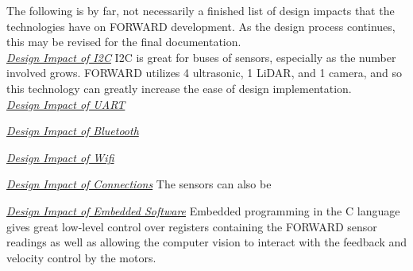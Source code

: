 \newline \noindent The following is by far, not necessarily a finished list of design impacts that the technologies have on FORWARD development. As the design process continues, this may be revised for the final documentation.\\

\noindent \underline{\textit{Design Impact of I2C}}
I2C is great for buses of sensors, especially as the number involved grows. FORWARD utilizes 4 ultrasonic, 1 LiDAR, and 1 camera, and so this technology can greatly increase the ease of design implementation.\\

\noindent \underline{\textit{Design Impact of UART}}
	
	
\noindent \underline{\textit{Design Impact of Bluetooth}}


\noindent \underline{\textit{Design Impact of Wifi}}


\noindent \underline{\textit{Design Impact of Connections}}
The sensors can also be 

\noindent \underline{\textit{Design Impact of Embedded Software}}
Embedded programming in the C language gives great low-level control over registers containing the FORWARD sensor readings as well as allowing the computer vision to interact with the feedback and velocity control by the motors.\\

